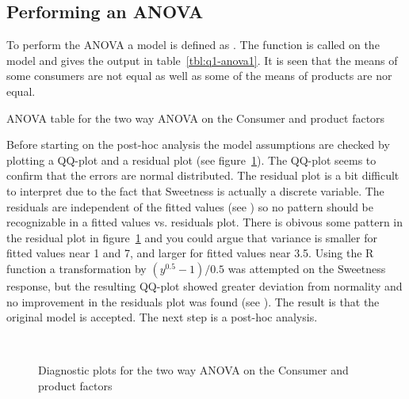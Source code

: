 \subsection*{Performing an ANOVA}
To perform the ANOVA a model is defined as . The  function is called on the model and gives the output in table~\ref{tbl:q1-anova1}. It is seen that the means of some consumers are not equal as well as some of the means of products are nor equal.
\begin{table}
    \centering
    
    \caption{ANOVA table for the two way ANOVA on the Consumer and product factors}\label{tbl:q1-anova1}
\end{table}

Before starting on the post-hoc analysis the model assumptions are checked by plotting a QQ-plot and a residual plot (see figure~\ref{fig:qq-and-residuals}). The QQ-plot seems to confirm that the errors are normal distributed. The residual plot is a bit difficult to interpret due to the fact that Sweetness is actually a discrete variable. The residuals are independent of the fitted values (see \cite[p.85]{bingham10}) so no pattern should be recognizable in a fitted values vs. residuals plot. There is obivous some pattern in the residual plot in figure~\ref{fig:qq-and-residuals} and you could argue that variance is smaller for fitted values near 1 and 7, and larger for fitted values near 3.5. Using the R function  a transformation by $(y^{0.5} - 1)/0.5$ was attempted on the Sweetness response, but the resulting QQ-plot showed greater deviation from normality and no improvement in the residuals plot was found (see ). The result is that the original model is accepted. The next step is a post-hoc analysis.

\begin{figure}
    \centering
    \mbox{   \quad 
            }
    \caption{Diagnostic plots for the two way ANOVA on the Consumer and product factors}
    \label{fig:qq-and-residuals}
\end{figure}

